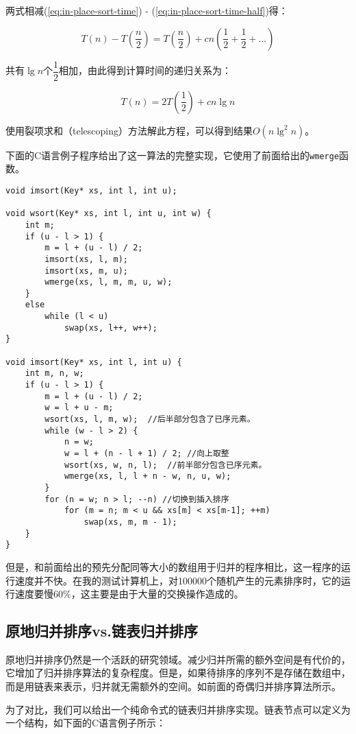\documentclass[UTF8]{article}
\begin{document}
两式相减(\ref{eq:in-place-sort-time}) - (\ref{eq:in-place-sort-time-half})得：

\[
T(n) - T(\frac{n}{2}) = T(\frac{n}{2}) + c n (\frac{1}{2} + \frac{1}{2} + ... )
\]

共有$\lg n$个$\dfrac{1}{2}$相加，由此得到计算时间的递归关系为：

\[
T(n) = 2 T(\frac{1}{2}) + c n \lg n
\]

使用裂项求和（telescoping）方法解此方程，可以得到结果$O(n \lg^2 n)$。

下面的C语言例子程序给出了这一算法的完整实现，它使用了前面给出的\texttt{wmerge}函数。

\lstset{language=C}
\begin{lstlisting}
void imsort(Key* xs, int l, int u);

void wsort(Key* xs, int l, int u, int w) {
    int m;
    if (u - l > 1) {
        m = l + (u - l) / 2;
        imsort(xs, l, m);
        imsort(xs, m, u);
        wmerge(xs, l, m, m, u, w);
    }
    else
        while (l < u)
            swap(xs, l++, w++);
}

void imsort(Key* xs, int l, int u) {
    int m, n, w;
    if (u - l > 1) {
        m = l + (u - l) / 2;
        w = l + u - m;
        wsort(xs, l, m, w);  //后半部分包含了已序元素。
        while (w - l > 2) {
            n = w;
            w = l + (n - l + 1) / 2; //向上取整
            wsort(xs, w, n, l);  //前半部分包含已序元素。
            wmerge(xs, l, l + n - w, n, u, w);
        }
        for (n = w; n > l; --n) //切换到插入排序
            for (m = n; m < u && xs[m] < xs[m-1]; ++m)
                swap(xs, m, m - 1);
    }
}
\end{lstlisting}

但是，和前面给出的预先分配同等大小的数组用于归并的程序相比，这一程序的运行速度并不快。在我的测试计算机上，对100000个随机产生的元素排序时，它的运行速度要慢60\%，这主要是由于大量的交换操作造成的。

\subsection{原地归并排序vs.链表归并排序}

原地归并排序仍然是一个活跃的研究领域。减少归并所需的额外空间是有代价的，它增加了归并排序算法的复杂程度。但是，如果待排序的序列不是存储在数组中，而是用链表来表示，归并就无需额外的空间。如前面的奇偶归并排序算法所示。

为了对比，我们可以给出一个纯命令式的链表归并排序实现。链表节点可以定义为一个结构，如下面的C语言例子所示：
\end{document}
